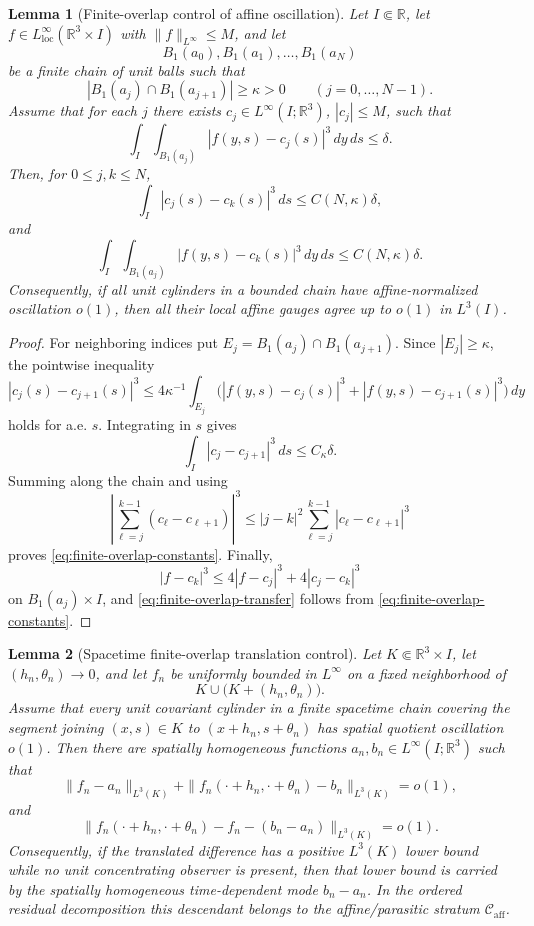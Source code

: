 \documentclass[11pt]{amsart}
\numberwithin{equation}{section}
\theoremstyle{plain}
\newtheorem{lemma}[lemma]{Lemma}
\theoremstyle{definition}
\theoremstyle{remark}
\newcommand{\loc}{\mathrm{loc}}
\newcommand{\Caff}{\mathcal C_{\mathrm{aff}}}
\begin{document}
\begin{lemma}[Finite-overlap control of affine oscillation]
\label{lem:finite-overlap-affine-oscillation}
Let \(I\Subset\mathbb R\), let \(f\in L^\infty_{\loc}(\mathbb R^3\times I)\)
with \(\|f\|_{L^\infty}\le M\), and let
\[
   B_1(a_0),B_1(a_1),\dots,B_1(a_N)
\]
be a finite chain of unit balls such that
\[
   |B_1(a_j)\cap B_1(a_{j+1})|\ge\kappa>0
   \qquad (j=0,\dots,N-1).
\]
Assume that for each \(j\) there exists
\(c_j\in L^\infty(I;\mathbb R^3)\), \(|c_j|\le M\), such that
\[
   \int_I\int_{B_1(a_j)}|f(y,s)-c_j(s)|^3\,dy\,ds\le \delta .
\]
Then, for \(0\le j,k\le N\),
\begin{equation}\label{eq:finite-overlap-constants}
   \int_I |c_j(s)-c_k(s)|^3\,ds
   \le C(N,\kappa)\delta ,
\end{equation}
and
\begin{equation}\label{eq:finite-overlap-transfer}
   \int_I\int_{B_1(a_j)}|f(y,s)-c_k(s)|^3\,dy\,ds
   \le C(N,\kappa)\delta .
\end{equation}
Consequently, if all unit cylinders in a bounded chain have affine-normalized
oscillation \(o(1)\), then all their local affine gauges agree up to \(o(1)\)
in \(L^3(I)\).
\end{lemma}

\begin{proof}
For neighboring indices put \(E_j=B_1(a_j)\cap B_1(a_{j+1})\).  Since
\(|E_j|\ge\kappa\), the pointwise inequality
\[
   |c_j(s)-c_{j+1}(s)|^3
   \le
   4\kappa^{-1}\int_{E_j}
   \bigl(|f(y,s)-c_j(s)|^3+|f(y,s)-c_{j+1}(s)|^3\bigr)\,dy
\]
holds for a.e. \(s\).  Integrating in \(s\) gives
\[
   \int_I|c_j-c_{j+1}|^3\,ds\le C_\kappa\delta .
\]
Summing along the chain and using
\[
   \left|\sum_{\ell=j}^{k-1}(c_\ell-c_{\ell+1})\right|^3
   \le |j-k|^2\sum_{\ell=j}^{k-1}|c_\ell-c_{\ell+1}|^3
\]
proves \eqref{eq:finite-overlap-constants}.  Finally,
\[
   |f-c_k|^3\le4|f-c_j|^3+4|c_j-c_k|^3
\]
on \(B_1(a_j)\times I\), and
\eqref{eq:finite-overlap-transfer} follows from
\eqref{eq:finite-overlap-constants}.
\end{proof}

\begin{lemma}[Spacetime finite-overlap translation control]
\label{lem:spacetime-finite-overlap-translation}
Let \(K\Subset\mathbb R^3\times I\), let
\((h_n,\theta_n)\to0\), and let \(f_n\) be uniformly bounded in \(L^\infty\) on
a fixed neighborhood of
\[
   K\cup\bigl(K+(h_n,\theta_n)\bigr).
\]
Assume that every unit covariant cylinder in a finite spacetime chain covering
the segment joining \((x,s)\in K\) to \((x+h_n,s+\theta_n)\) has spatial
quotient oscillation \(o(1)\).  Then there are
spatially homogeneous functions \(a_n,b_n\in L^\infty(I;\mathbb R^3)\) such
that
\[
   \|f_n-a_n\|_{L^3(K)}
   +\|f_n(\cdot+h_n,\cdot+\theta_n)-b_n\|_{L^3(K)}
   =o(1),
\]
and
\[
   \|f_n(\cdot+h_n,\cdot+\theta_n)-f_n-(b_n-a_n)\|_{L^3(K)}=o(1).
\]
Consequently, if the translated difference has a positive \(L^3(K)\) lower
bound while no unit concentrating observer is present, then that lower bound is
carried by the spatially homogeneous time-dependent mode \(b_n-a_n\).  In the
ordered residual decomposition this descendant belongs to the affine/parasitic stratum
\(\Caff\).
\end{lemma}
\end{document}
